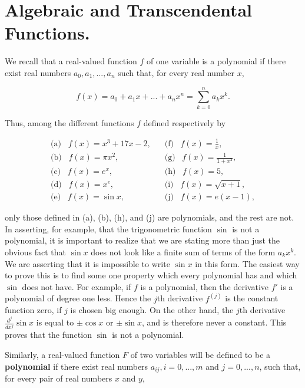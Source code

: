 \section{Algebraic and Transcendental Functions.}
 We recall that a real-valued function $f$ of one variable is a polynomial if there exist real numbers $a_{0}, a_{1}, . . ., a_{n}$ such that, for every real number $x$, 

$$
f(x) = a_{0} + a_{1}x + ... + a_{n}x^{n} = \sum_{k = 0}^{n} a_{k}x^k.
$$

\noindent Thus, among the different functions $f$ defined respectively by

$$
\begin{array}{ll}
\mbox{(a)}\;\;\; f(x) = x^3 + 17x - 2, \;\;\; &\mbox{(f)}\;\;\; f(x) = \frac{1}{x}, \\
\mbox{(b)}\;\;\; f(x) = \pi x^2,                  &\mbox{(g)}\;\;\; f(x) = \frac{1}{1 + x^2},\\
\mbox{(c)}\;\;\; f(x) = e^{x},                     &\mbox{(h)}\;\;\; f(x) = 5, \\
\mbox{(d)}\;\;\; f(x) = x^{e},                     &\mbox{(i)}\;\;\; f(x) = \sqrt{x + 1}, \\
\mbox{(e)}\;\;\; f(x) = \sin x,                    &\mbox{(j)}\;\;\; f(x) = e(x - 1),
\end{array}
$$

\noindent only those defined in (a), (b), (h), and (j) are polynomials, and the rest are not. In asserting,
for example, that the trigonometric function $\sin$ is not a polynomial, it is important to realize
that we are stating more than just the obvious fact that $\sin x$ does not look like a finite sum of
terms of the form $a_{k}x^k$. We are asserting that it is impossible to write $\sin x$ in this form. 
The easiest way to prove this is to find some one property which every polynomial has and which
$\sin$ does not have. For example, if $f$ is a polynomial, then the derivative $f'$ is a polynomial of
degree one less. Hence the $j$th derivative $f^{(j)}$ is the constant function zero, if $j$ is chosen big
enough. On the other hand, the $j$th derivative $\frac{d^j}{dx^j} \sin x$ is equal to $\pm \cos x$ or $\pm \sin x$, and is therefore never a constant. This proves that the function $\sin$ is not a polynomial.

Similarly, a real-valued function $F$ of two variables will be defined to be a \textbf{polynomial} if there exist real numbers $a_{ij}, i = 0, . . ., m$ and $j = 0, . . ., n$, such that, for every pair of real
numbers $x$ and $y$,


